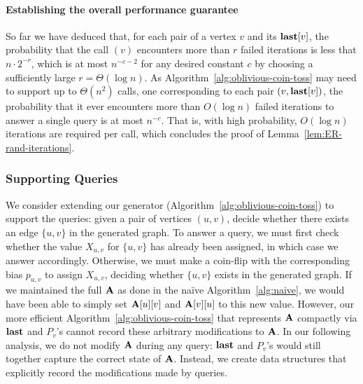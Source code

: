 \paragraph*{Establishing the overall performance guarantee}
So far we have deduced that, for each pair of a vertex $v$ and its $\mathbf{last}[v]$, the probability that the call $(v)$ encounters more than $r$ failed iterations is less that $n \cdot 2^{-r}$, which is at most $n^{-c-2}$ for any desired constant $c$ by choosing a sufficiently large $r = \Theta(\log n)$. As Algorithm~\ref{alg:oblivious-coin-toss} may need to support up to $\Theta(n^2)$  calls, one corresponding to each pair $(v, \mathbf{last}[v])$, the probability that it ever encounters more than $O(\log n)$  failed iterations to answer a single  query is at most $n^{-c}$. That is, with high probability, $O(\log n)$ iterations are required per  call, which concludes the proof of Lemma~\ref{lem:ER-rand-iterations}.

\subsubsection{Supporting  Queries} \label{sec:ER-pair}
We consider extending our generator (Algorithm~\ref{alg:oblivious-coin-toss}) to support the  queries: given a pair of vertices $(u, v)$, decide whether there exists an edge $\{u, v\}$ in the generated graph. To answer a  query, we must first check whether the value $X_{u,v}$ for $\{u, v\}$ has already been assigned, in which case we answer accordingly. Otherwise, we must make a coin-flip with the corresponding bias $p_{u,v}$ to assign $X_{u,v}$, deciding whether $\{u, v\}$ exists in the generated graph. If we maintained the full $\mathbf{A}$ as done in the na\"{i}ve Algorithm~\ref{alg:naive}, we would have been able to simply set $\mathbf{A}[u][v]$ and $\mathbf{A}[v][u]$ to this new value. However, our more efficient Algorithm~\ref{alg:oblivious-coin-toss} that represents $\mathbf{A}$ compactly via $\mathbf{last}$ and $P_v$'s cannot record these arbitrary modifications to $\mathbf{A}$. In our following analysis, we do not modify $\mathbf{A}$ during any  query: $\mathbf{last}$ and $P_v$'s would still together capture the correct state of $\mathbf{A}$. Instead, we create data structures that explicitly record the modifications made by  queries.

